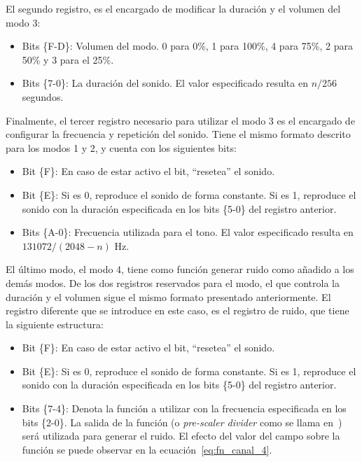 {El segundo registro, es el encargado de modificar la duración y el volumen del modo 3:

\begin{itemize}
	\item Bits \{F-D\}: Volumen del modo. 0 para 0\%, 1 para 100\%, 4 para 75\%, 2 para 50\% y 3 para el 25\%.
	\item Bits \{7-0\}: La duración del sonido. El valor especificado resulta en $n/256$ segundos.
\end{itemize}

Finalmente, el tercer registro necesario para utilizar el modo 3 es el encargado de configurar la frecuencia y repetición del sonido. Tiene el mismo formato descrito para los modos 1 y 2, y cuenta con los siguientes bits:

\begin{itemize}
	\item Bit \{F\}: En caso de estar activo el bit, ``resetea'' el sonido.
	\item Bit \{E\}: Si es 0, reproduce el sonido de forma constante. Si es 1, reproduce el sonido con la duración especificada en los bits \{5-0\} del registro anterior.
	\item Bits \{A-0\}: Frecuencia utilizada para el tono. El valor especificado resulta en $131072/(2048-n)$ Hz.
\end{itemize}

El último modo, el modo 4, tiene como función generar ruido como añadido a los demás modos. De los dos registros reservados para el modo, el que controla la duración y el volumen sigue el mismo formato presentado anteriormente. El registro diferente que se introduce en este caso, es el registro de ruido, que tiene la siguiente estructura:

\begin{itemize}
	\item Bit \{F\}: En caso de estar activo el bit, ``resetea'' el sonido.
	\item Bit \{E\}: Si es 0, reproduce el sonido de forma constante. Si es 1, reproduce el sonido con la duración especificada en los bits \{5-0\} del registro anterior.
	\item Bits \{7-4\}: Denota la función a utilizar con la frecuencia especificada en los bits \{2-0\}. La salida de la función (o \textit{pre-scaler divider} como se llama en~\cite{bib:belogic}) será utilizada para generar el ruido. El efecto del valor del campo sobre la función se puede observar en la ecuación~\ref{eq:fn_canal_4}.


\end{itemize}}
